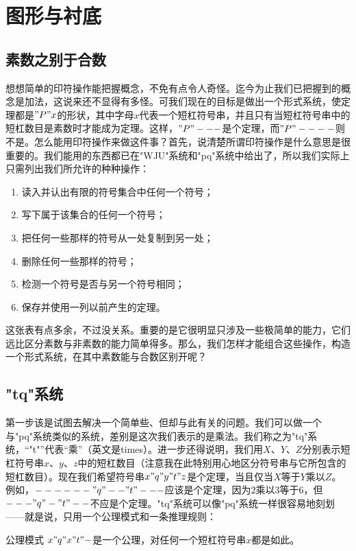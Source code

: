 
\chapter{图形与衬底}

\section{素数之别于合数}

想想简单的印符操作能把握概念，不免有点令人奇怪。迄今为止我们已把握到的概念是加法，这说来还不显得有多怪。可我们现在的目标是做出一个形式系统，使定理都是$"P"x$的形状，其中字母$x$代表一个短杠符号串，并且只有当短杠符号串中的短杠数目是素数时才能成为定理。这样，$"P"---$是个定理，而$"P"----$则不是。怎么能用印符操作来做这件事？首先，说清楚所谓印符操作是什么意思是很重要的。我们能用的东西都已在"WJU"系统和"pq"系统中给出了，所以我们实际上只需列出我们所允许的种种操作：
\begin{enumerate}
\item 读入并认出有限的符号集合中任何一个符号；
\item 写下属于该集合的任何一个符号；
\item 把任何一些那样的符号从一处复制到另一处；
\item 删除任何一些那样的符号；
\item 检测一个符号是否与另一个符号相同；
\item 保存并使用一列以前产生的定理。
\end{enumerate}
这张表有点多余，不过没关系。重要的是它很明显只涉及一些极简单的能力，它们远比区分素数与非素数的能力简单得多。那么，我们怎样才能组合这些操作，构造一个形式系统，在其中素数能与合数区别开呢？

\section{"tq"系统}

第一步该是试图去解决一个简单些、但却与此有关的问题。我们可以做一个与"pq"系统类似的系统，差别是这次我们表示的是乘法。我们称之为"tq"系统，“"t"”代表“乘”（英文是times）。进一步还得说明，我们用$X$、$Y$、$Z$分别表示短杠符号串$x$、$y$、$z$中的短杠数目（注意我在此特别用心地区分符号串与它所包含的短杠数目）。现在我们希望符号串$x"q"y"t"z$是个定理，当且仅当$X$等于$Y$乘以$Z$。例如，$------"q"--"t"---$应该是个定理，因为$2$乘以$3$等于$6$，但$---"q"-"t"--$不应是个定理。"tq"系统可以像"pq"系统一样很容易地刻划——就是说，只用一个公理模式和一条推理规则：
\begin{thm}{公理模式}
$x"q"x"t"-$是一个公理，对任何一个短杠符号串$x$都是如此。
\end{thm}

